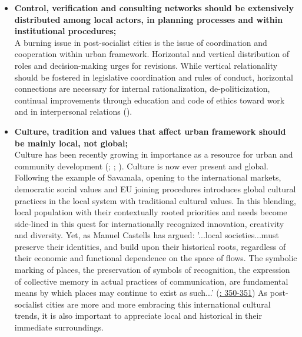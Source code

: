 \documentclass[11pt]{report}
\begin{document}
{{{\begin{itemize}
\item \textbf{Control, verification and consulting networks should be extensively distributed among local actors, in planning processes and within institutional procedures;}
\\
A burning issue in post-socialist cities is the issue of coordination and cooperation within urban framework.
Horizontal and vertical distribution of roles and decision-making urges for revisions.
While vertical relationality should be fostered in legislative coordination and rules of conduct, horizontal connections are necessary for internal rationalization, de-politicization, continual improvements through education and code of ethics toward work and in interpersonal relations (\href{Vujosevic}{\citealt{vujosevic_regionalizam_2015}}).
     
\item \textbf{Culture, tradition and values that affect urban framework should be mainly local, not global;}
\\
Culture has been recently growing in importance as a resource for urban  and  community development (\href{Bianchini}{\citealt{Bianchini 1999}}; \href{Mercer}{\citealt{mercer_cultural_2006}}; \href{Volic} {\citealt{volic_belgrade_2012}}).
Culture is now ever present and global.
Following the example of Savamala, opening to the international markets, democratic social values and EU joining procedures introduces global cultural practices in the local system with traditional cultural values. 
In this blending, local population with their contextually rooted priorities and needs become side-lined in this quest for internationally recognized innovation, creativity and diversity.
Yet, as Manuel Castells has
argued:
'...local societies...must preserve their identities, and build upon their historical roots,
regardless of their economic and functional dependence on the space of flows. The
symbolic marking of places, the preservation of symbols of recognition, the expression
of collective memory in actual practices of communication, are fundamental means by
which places may continue to exist as such...' (\href{Castells}{\citealt{castells_informational_1991}: 350-351})
As post-socialist cities are more and more embracing this international cultural trends, it is also important to appreciate local and historical in their immediate surroundings.


\end{itemize}}}}
\end{document}
